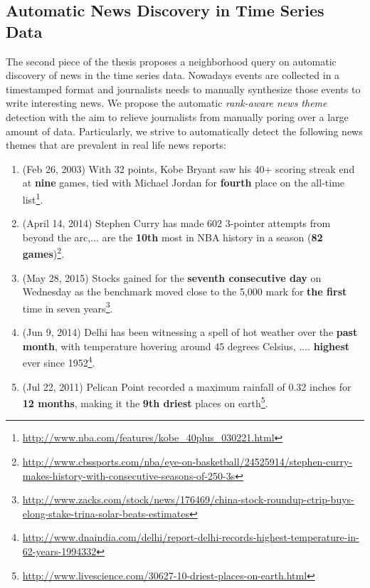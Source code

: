 \subsection{Automatic News Discovery in Time Series Data}
The second piece of the thesis proposes a neighborhood
query on automatic discovery of news in the time series data.
Nowadays events are collected in a timestamped format and journalists needs to manually synthesize those events to write interesting news. We propose the automatic \emph{rank-aware news theme} detection with the aim to relieve journalists from manually poring over a large amount of data. Particularly, we strive to
automatically detect the following news themes that are prevalent in real life news reports: 

\begin{enumerate}
\setlength\itemsep{-0.05cm}
\item(Feb 26, 2003) With 32 points, Kobe Bryant saw his 40+ scoring streak end at \textbf{nine} games,  tied with Michael Jordan for \textbf{fourth} place on the all-time list\footnote{\url{http://www.nba.com/features/kobe_40plus_030221.html}}. 

\item(April 14, 2014) Stephen Curry has made 602 3-pointer attempts from beyond the arc,... are the \textbf{10th} most in NBA history in a season (\textbf{82 games})\footnote{\url{http://www.cbssports.com/nba/eye-on-basketball/24525914/stephen-curry-makes-history-with-consecutive-seasons-of-250-3s}}.

\item (May 28, 2015) Stocks gained for the \textbf{seventh consecutive day} on Wednesday as the benchmark moved close to the 5,000 mark for \textbf{the first} time in seven years\footnote{\url{http://www.zacks.com/stock/news/176469/china-stock-roundup-ctrip-buys-elong-stake-trina-solar-beats-estimates}}.

\item (Jun 9,  2014) Delhi has been witnessing a spell of hot weather  over the \textbf{past month}, with temperature hovering around 45 degrees Celsius, .... \textbf{highest} ever since 1952\footnote{\url{http://www.dnaindia.com/delhi/report-delhi-records-highest-temperature-in-62-years-1994332}}.

\item(Jul 22, 2011) Pelican Point recorded a maximum rainfall of 0.32 inches for \textbf{12 months}, making it the  \textbf{9th driest} places on earth\footnote{\url{http://www.livescience.com/30627-10-driest-places-on-earth.html}}.
\end{enumerate}


